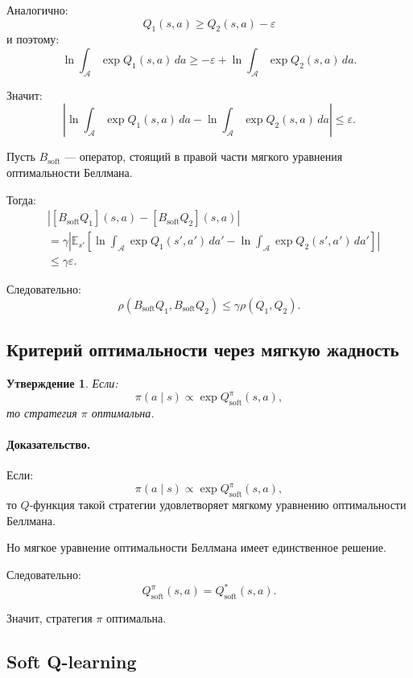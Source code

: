\documentclass[12pt,a4paper]{article}
\newtheorem{statement}{Утверждение}
\begin{document}
Аналогично:
\[
Q_1(s,a)
\ge
Q_2(s,a)-\varepsilon
\]
и поэтому:
\[
\ln
\int_{\mathcal A}
\exp Q_1(s,a)
\,da
\ge
-\varepsilon
+
\ln
\int_{\mathcal A}
\exp Q_2(s,a)
\,da.
\]

Значит:
\[
\left|
\ln
\int_{\mathcal A}
\exp Q_1(s,a)
\,da
-
\ln
\int_{\mathcal A}
\exp Q_2(s,a)
\,da
\right|
\le
\varepsilon.
\]

Пусть $B_{\mathrm{soft}}$ --- оператор, стоящий в правой части мягкого уравнения оптимальности Беллмана.

Тогда:
\[
\begin{aligned}
&
\left|
[B_{\mathrm{soft}}Q_1](s,a)
-
[B_{\mathrm{soft}}Q_2](s,a)
\right|
\\
&=
\gamma
\left|
\mathbb E_{s'}
\left[
\ln
\int_{\mathcal A}
\exp Q_1(s',a')
\,da'
-
\ln
\int_{\mathcal A}
\exp Q_2(s',a')
\,da'
\right]
\right|
\\
&\le
\gamma\varepsilon.
\end{aligned}
\]

Следовательно:
\[
\rho(B_{\mathrm{soft}}Q_1,B_{\mathrm{soft}}Q_2)
\le
\gamma
\rho(Q_1,Q_2).
\]

\subsection{Критерий оптимальности через мягкую жадность}

\begin{statement}
Если:
\[
\pi(a\mid s)
\propto
\exp Q^\pi_{\mathrm{soft}}(s,a),
\]
то стратегия $\pi$ оптимальна.
\end{statement}

\paragraph{Доказательство.}

Если:
\[
\pi(a\mid s)
\propto
\exp Q^\pi_{\mathrm{soft}}(s,a),
\]
то $Q$-функция такой стратегии удовлетворяет мягкому уравнению оптимальности Беллмана.

Но мягкое уравнение оптимальности Беллмана имеет единственное решение.

Следовательно:
\[
Q^\pi_{\mathrm{soft}}(s,a)
=
Q^\ast_{\mathrm{soft}}(s,a).
\]

Значит, стратегия $\pi$ оптимальна.

\subsection{Soft Q-learning}
\end{document}

